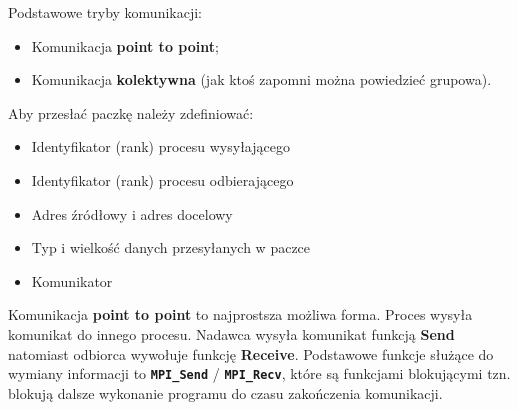 Podstawowe tryby komunikacji:
\begin{itemize}
\item Komunikacja \textbf{point to point};
\item Komunikacja \textbf{kolektywna} (jak ktoś zapomni można powiedzieć grupowa).
\end{itemize}

Aby przesłać paczkę należy zdefiniować: 
\begin{itemize}
\item Identyfikator (rank) procesu wysyłającego 
\item Identyfikator (rank) procesu odbierającego 
\item Adres źródłowy i adres docelowy
\item Typ i wielkość danych przesyłanych w paczce
\item Komunikator
\end{itemize}

Komunikacja \textbf{point to point} to najprostsza możliwa forma. Proces wysyła komunikat do innego procesu. Nadawca wysyła komunikat funkcją \textbf{Send} natomiast odbiorca  wywołuje funkcję \textbf{Receive}. Podstawowe funkcje służące do wymiany informacji to \texttt{\textbf{MPI\_Send}} / \texttt{\textbf{MPI\_Recv}}, które są funkcjami blokującymi tzn. blokują dalsze wykonanie programu do czasu zakończenia komunikacji.

